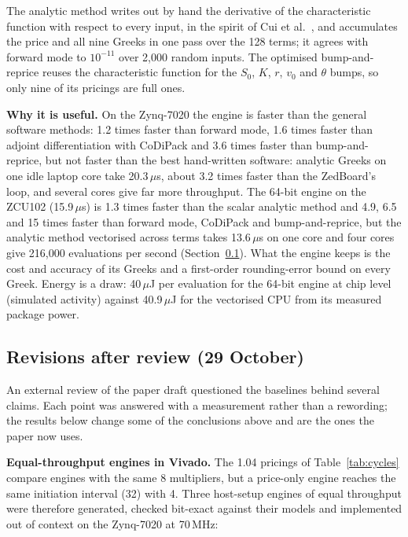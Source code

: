 \documentclass[11pt,a4paper]{article}
\newcommand{\useful}[1]{\par\noindent\textbf{\textcolor{accent}{Why it is useful.}} #1\par}
\begin{document}
The analytic method writes out by hand the derivative of the characteristic function
with respect to every input, in the spirit of Cui et al.~\cite{cui}, and accumulates the
price and all nine Greeks in one pass over the 128 terms; it agrees with forward mode to
$10^{-11}$ over 2,000 random inputs. The optimised bump-and-reprice reuses the
characteristic function for the $S_0$, $K$, $r$, $v_0$ and $\theta$ bumps, so only nine
of its pricings are full ones.

\useful{On the Zynq-7020 the engine is faster than the general software methods: 1.2
times faster than forward mode, 1.6 times faster than adjoint differentiation with
CoDiPack and 3.6 times faster than bump-and-reprice, but not faster than the best
hand-written software: analytic Greeks on one idle laptop core take 20.3\,$\mu$s, about
3.2 times faster than the ZedBoard's loop, and several cores give far more throughput.
The 64-bit engine on the ZCU102 (15.9\,$\mu$s) is 1.3 times faster than the scalar analytic
method and 4.9, 6.5 and 15 times faster than forward mode, CoDiPack and bump-and-reprice, but
the analytic method vectorised across terms takes 13.6\,$\mu$s on one core and four cores give
216,000 evaluations per second (Section~\ref{sec:review}). What the engine keeps is the cost
and accuracy of its Greeks and a first-order rounding-error bound on every Greek. Energy is a
draw: 40\,$\mu$J per evaluation for the 64-bit engine at chip level (simulated activity) against
40.9\,$\mu$J for the vectorised CPU from its measured package power.}

\subsection{Revisions after review (29 October)}
\label{sec:review}
An external review of the paper draft questioned the baselines behind several claims. Each
point was answered with a measurement rather than a rewording; the results below change some
of the conclusions above and are the ones the paper now uses.

\textbf{Equal-throughput engines in Vivado.} The 1.04 pricings of Table~\ref{tab:cycles}
compare engines with the same 8 multipliers, but a price-only engine reaches the same initiation
interval (32) with 4. Three host-setup engines of equal throughput were therefore generated,
checked bit-exact against their models and implemented out of context on the Zynq-7020 at
70\,MHz:
\end{document}
